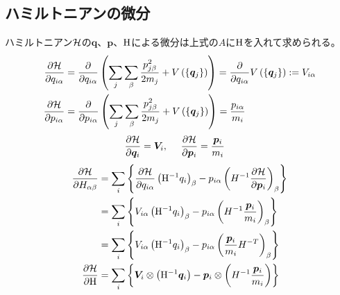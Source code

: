 \documentclass[11pt,a4paper,uplatex]{jsarticle}
\begin{document}
\subsection{ハミルトニアンの微分}
ハミルトニアン${\cal H}$の$\bm{q}$、$\bm{p}$、${\rm H}$による微分は上式の$A$に${\rm H}$を入れて求められる。
\begin{align}
    \frac{\partial {\cal H}}{\partial q_{i \alpha}} &= \frac{\partial}{\partial q_{i \alpha}} \left( \sum_{j} \sum_{\beta}\frac{p_{j \beta}^{2}}{2m_{j}} + V \left(\{\bm{q}_{j}\}\right)\right) 
    = \frac{\partial}{\partial q_{i \alpha}} V \left(\{\bm{q}_{j}\}\right) 
    := V_{i \alpha} \\
    \frac{\partial {\cal H}}{\partial p_{i \alpha}} &= \frac{\partial}{\partial p_{i \alpha}} \left( \sum_{j} \sum_{\beta}\frac{p_{j \beta}^{2}}{2m_{j}} + V \left(\{\bm{q}_{j}\}\right)\right) 
    = \frac{p_{i \alpha}}{m_{i}}
\end{align}
\begin{align}
    \frac{\partial {\cal H}}{\partial \bm{q}_{i}} &= \bm{V}_{i} ,  \ \ \ \  
    \frac{\partial {\cal H}}{\partial \bm{p}_{i}} = \frac{\bm{p}_{i}}{m_{i}}
\end{align}
\begin{align}
    \frac{\partial {\cal H}}{\partial H_{\alpha \beta}} 
    &= \sum_{i} \left\{ \frac{\partial {\cal H}}{\partial q_{i \alpha}} \left({\rm H}^{-1} q_{i}\right)_{\beta}
    -  p_{i \alpha} \left( H^{-1} \frac{\partial {\cal H}}{\partial \bm{p}_{i}}  \right)_{\beta} \right\} \\
    &= \sum_{i} \left\{ V_{i \alpha} \left({\rm H}^{-1} q_{i}\right)_{\beta}
    -  p_{i \alpha} \left( H^{-1}\frac{\bm{p}_{i}}{m_{i}}  \right)_{\beta} \right\} \\
    &= \sum_{i} \left\{ V_{i \alpha} \left({\rm H}^{-1} q_{i}\right)_{\beta}
    -  p_{i \alpha} \left( \frac{\bm{p}_{i}}{m_{i}} H^{-T} \right)_{\beta} \right\}  \\
    \frac{\partial {\cal H}}{\partial {\rm H}} &= \sum_{i}\left\{ \bm{V}_{i} \otimes   \left({\rm H}^{-1} \bm{q}_{i}\right) 
    - \bm{p}_{i} \otimes \left( H^{-1}\frac{\bm{p}_{i}}{m_{i}}  \right) \right\}     
\end{align}

\end{document}
